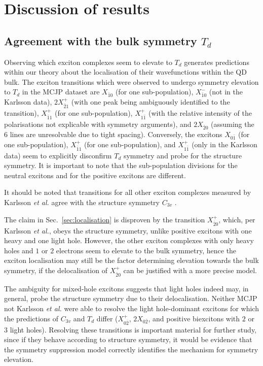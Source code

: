 \chapter{Discussion of results}

\section{Agreement with the bulk symmetry $T_d$}
Observing which exciton complexes seem to elevate to $T_d$ generates predictions within our theory about the localisation of their wavefunctions within the QD bulk. The exciton transitions which were observed to undergo symmetry elevation to $T_d$ in the MCJP dataset are $X_{\bar{1}0}$ (for one sub-population), $X^-_{\bar{1}0}$ (not in the Karlsson data), $2X^+_{\bar{2}1}$ (with one peak being ambiguously identified to the transition), $X^+_{\bar{1}1}$ (for one sub-population),  $X^+_{1\bar{1}}$ (with the relative intensity of the polarisations not explicable with symmetry arguments), and $2X_{\bar{2}0}$ (assuming the $6$ lines are unresolvable due to tight spacing). Conversely, the excitons $X_{0\bar{1}}$ (for one sub-population), $X^+_{\bar{1}1}$ (for one sub-population), and $X^+_{1\bar{1}}$ (only in the Karlsson data) seem to explicitly disconfirm $T_d$ symmetry and probe for the structure symmetry. It is important to note that the sub-population divisions for the neutral excitons and for the positive excitons are different.

It should be noted that transitions for all other exciton complexes measured by Karlsson \textit{et al.} agree with the structure symmetry $C_{3v}$ \cite[p.~20]{karlsson}.

The claim in Sec.~\ref{sec:localisation} is disproven by the transition $X^+_{\bar{2}0}$, which, per Karlsson \textit{et al.}, obeys the structure symmetry, unlike positive excitons with one heavy and one light hole. However, the other exciton complexes with only heavy holes and $1$ or $2$ electrons seem to elevate to the bulk symmetry, hence the exciton localisation may still be the factor determining elevation towards the bulk symmetry, if the delocalisation of $X^+_{\bar{2}0}$ can be justified with a more precise model.

The ambiguity for mixed-hole excitons suggests that light holes indeed may, in general, probe the structure symmetry due to their delocalisation. Neither MCJP not Karlsson \textit{et al.} were able to resolve the light hole-dominant excitons for which the predictions of $C_{3v}$ and $T_d$ differ ($X^+_{0\bar{2}}$, $2X_{0\bar{2}}$, and positive biexcitons with $2$ or $3$ light holes). Resolving these transitions is important material for further study, since if they behave according to structure symmetry, it would be evidence that the symmetry suppression model correctly identifies the mechanism for symmetry elevation.

